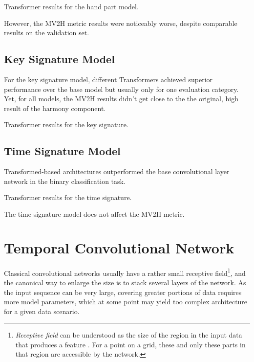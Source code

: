 \begin{table}[ht!]
\centering

\caption[Transformer results for the hand part model.]{Transformer results for the hand part model.}
\label{hand_part_transformer}
\end{table}

However, the MV2H metric results were noticeably worse, despite comparable results on the validation set. 

\subsection{Key Signature Model}

For the key signature model, different Transformers achieved superior performance over the base model but usually only for one evaluation category. Yet, for all models, the MV2H results didn't get close to the the original, high result of the harmony component.

\begin{table}[ht!]
\centering

\caption[Transformer results for the key signature.]{Transformer results for the key signature.}
\label{key_signature_transformer}
\end{table}

\subsection{Time Signature Model}

Transformed-based architectures outperformed the base convolutional layer network in the binary classification task.  

\begin{table}[ht!]
\centering

\caption[Transformer results for the time signature.]{Transformer results for the time signature.}
\label{time_signature_transformer}
\end{table}

The time signature model does not affect the MV2H metric.

\section{Temporal Convolutional Network}

Classical convolutional networks usually have a rather small receptive field\footnote{\emph{Receptive field} can be understood as the size of the region in the input data that produces a feature \cite{Araujo2019}. For a point on a grid, these and only these parts in that region are accessible by the network.}, and the canonical way to enlarge the size is to stack several layers of the network. As the input sequence can be very large, covering greater portions of data requires more model parameters, which at some point may yield too complex architecture for a given data scenario.

